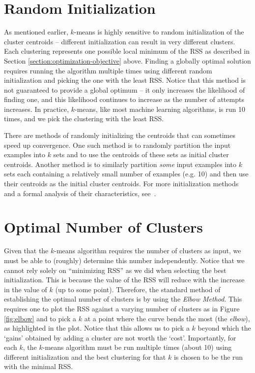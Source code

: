 \section{Random Initialization}

As mentioned earlier, $k$-means is highly sensitive to random initialization of the cluster centroids -- different initialization can result in very different clusters. Each clustering represents one possible local minimum of the RSS as described in Section \ref{section:optimization-objective} above. Finding a globally optimal solution requires running the algorithm multiple times using different random initialization and picking the one with the least RSS. Notice that this method is not guaranteed to provide a global optimum -- it only increases the likelihood of finding one, and this likelihood continues to increase as the number of attempts increases. In practice, $k$-means, like most machine learning algorithms, is run 10 times, and we pick the clustering with the least RSS. 

There are methods of randomly initializing the centroids that can sometimes speed up convergence. One such method is to randomly partition the input examples into $k$ sets and to use the centroids of these sets as initial cluster centroids. Another method is to similarly partition \emph{some} input examples into $k$ sets each containing a relatively small number of examples (e.g. 10) and then use their centroids as the initial cluster centroids. For more initialization methods and a formal analysis of their characteristics, see~\cite{CELEBI2013200,10.5555/645527.657466}. 

\section{Optimal Number of Clusters}
\label{sec:find-k}
Given that the $k$-means algorithm requires the number of clusters as input, we must be able to (roughly) determine this number independently. Notice that we cannot rely solely on ``minimizing RSS'' as we did when selecting the best initialization. This is because the value of the RSS will reduce with the increase in the value of $k$ (up to some point). Therefore, the standard method of establishing the optimal number of clusters is by using the \emph{Elbow Method}. This requires one to plot the RSS against a varying number of clusters as in Figure \ref{fig:elbow} and to pick a $k$ at a point where the curve bends the most (the \emph{elbow}), as highlighted in the plot. Notice that this allows us to pick a $k$ beyond which the `gains' obtained by adding a cluster are not worth the `cost'. Importantly, for each $k$, the $k$-means algorithm must be run multiple times (about 10) using different initialization and the best clustering for that $k$ is chosen to be the run with the minimal RSS. 

